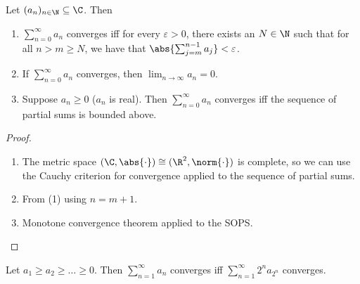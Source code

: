 \begin{theorem} \label{thm:series:convergence}
    Let $(a_n)_{n \in \N} \subseteq \C$.
    Then
    \begin{enumerate}[label=(\arabic*)]
        \item $\sum_{n = 0}^{\infty} a_n$ converges iff for every
        $\varepsilon > 0$, there exists an $N \in \N$ such that for all
        $n > m \ge N$, we have that
        $\abs{\sum_{j=m}^{n-1} a_j} < \varepsilon$.
        \item If $\sum_{n = 0}^{\infty} a_n$ converges, then
        $\lim_{n \to \infty} a_n = 0$.
        \item Suppose $a_n \ge 0$ ($a_n$ is real).
        Then $\sum_{n = 0}^{\infty} a_n$ converges iff the sequence of
        partial sums is bounded above.
    \end{enumerate}
\end{theorem}
\begin{proof} \leavevmode
    \begin{enumerate}[label=(\arabic*)]
        \item The metric space
        $(\C, \abs{\cdot}) \cong (\R^2, \norm{\cdot})$ is complete,
        so we can use the Cauchy criterion for convergence applied to the
        sequence of partial sums.
        \item From (1) using $n = m + 1$.
        \item Monotone convergence theorem applied to the SOPS. \qedhere
    \end{enumerate}
\end{proof}
\begin{theorem*} \label{thm:series:condensation}
    Let $a_1 \ge a_2 \ge \dots \ge 0$.
    Then $\sum_{n=1}^\infty a_n$ converges iff
    $\sum_{n=1}^\infty 2^n a_{2^n}$ converges.
\end{theorem*}
